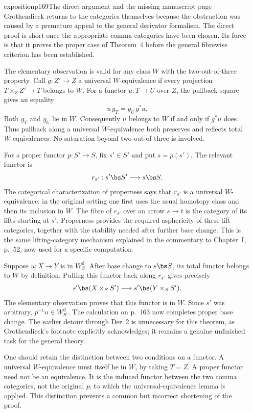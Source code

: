 \begin{dcomment}{exposition}{p169}{The direct argument and the missing manuscript page}
Grothendieck returns to the categories themselves because the obstruction was caused by a premature appeal to the general derivator formalism. The direct proof is short once the appropriate comma categories have been chosen. Its force is that it proves the proper case of Theorem~4 before the general fibrewise criterion has been established.

The elementary observation is valid for any class $W$ with the two-out-of-three property. Call $g:Z'\to Z$ a universal $W$-equivalence if every projection $T\times_Z Z'\to T$ belongs to $W$. For a functor $u:T\to U$ over $Z$, the pullback square gives an equality
\[
 u\,g_T=g_U\,g^*u.
\]
Both $g_T$ and $g_U$ lie in $W$. Consequently $u$ belongs to $W$ if and only if $g^*u$ does. Thus pullback along a universal $W$-equivalence both preserves and reflects total $W$-equivalences. No saturation beyond two-out-of-three is involved.

For a proper functor $p:S'\to S$, fix $s'\in S'$ and put $s=p(s')$. The relevant functor is
\[
 r_{s'}:s'\bs S'\longrightarrow s\bs S.
\]
The categorical characterization of properness says that $r_{s'}$ is a universal $W$-equivalence; in the original setting one first uses the usual homotopy class and then its inclusion in $W$. The fibre of $r_{s'}$ over an arrow $s\to t$ is the category of its lifts starting at $s'$. Properness provides the required asphericity of these lift categories, together with the stability needed after further base change. This is the same lifting-category mechanism explained in the commentary to Chapter~I, p.~52, now used for a specific computation.

Suppose $u:X\to Y$ is in $W_S^{\mathrm d}$. After base change to $s\bs S$, its total functor belongs to $W$ by definition. Pulling this functor back along $r_{s'}$ gives precisely
\[
 s'\bs(X\times_S S')\longrightarrow s'\bs(Y\times_S S').
\]
The elementary observation proves that this functor is in $W$. Since $s'$ was arbitrary, $p^{-1}u\in W_{S'}^{\mathrm d}$. The calculation on p.~163 now completes proper base change. The earlier detour through Der~2 is unnecessary for this theorem, as Grothendieck's footnote explicitly acknowledges; it remains a genuine unfinished task for the general theory.

One should retain the distinction between two conditions on a functor. A universal $W$-equivalence must itself be in $W$, by taking $T=Z$. A proper functor need not be an equivalence. It is the induced functor between the two comma categories, not the original $p$, to which the universal-equivalence lemma is applied. This distinction prevents a common but incorrect shortening of the proof.


\end{dcomment}
